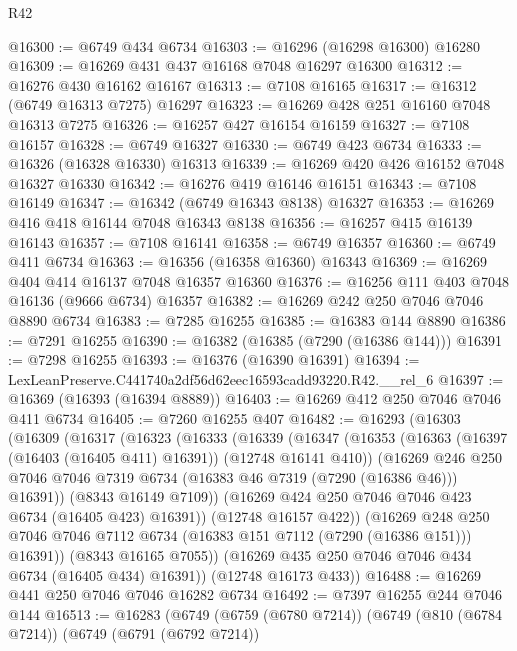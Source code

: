 \begin{lexlean}{R42}
\begin{coremodule}
{@16300 := @6749 @434 @6734
@16303 := @16296 (@16298 @16300) @16280
@16309 := @16269 @431 @437 @16168 @7048 @16297 @16300
@16312 := @16276 @430 @16162 @16167
@16313 := @7108 @16165
@16317 := @16312 (@6749 @16313 @7275) @16297
@16323 := @16269 @428 @251 @16160 @7048 @16313 @7275
@16326 := @16257 @427 @16154 @16159
@16327 := @7108 @16157
@16328 := @6749 @16327
@16330 := @6749 @423 @6734
@16333 := @16326 (@16328 @16330) @16313
@16339 := @16269 @420 @426 @16152 @7048 @16327 @16330
@16342 := @16276 @419 @16146 @16151
@16343 := @7108 @16149
@16347 := @16342 (@6749 @16343 @8138) @16327
@16353 := @16269 @416 @418 @16144 @7048 @16343 @8138
@16356 := @16257 @415 @16139 @16143
@16357 := @7108 @16141
@16358 := @6749 @16357
@16360 := @6749 @411 @6734
@16363 := @16356 (@16358 @16360) @16343
@16369 := @16269 @404 @414 @16137 @7048 @16357 @16360
@16376 := @16256 @111 @403 @7048 @16136 (@9666 @6734) @16357
@16382 := @16269 @242 @250 @7046 @7046 @8890 @6734
@16383 := @7285 @16255
@16385 := @16383 @144 @8890
@16386 := @7291 @16255
@16390 := @16382 (@16385 (@7290 (@16386 @144)))
@16391 := @7298 @16255
@16393 := @16376 (@16390 @16391)
@16394 := LexLeanPreserve.C441740a2df56d62eec16593cadd93220.R42.__rel_6
@16397 := @16369 (@16393 (@16394 @8889))
@16403 := @16269 @412 @250 @7046 @7046 @411 @6734
@16405 := @7260 @16255 @407
@16482 := @16293
    (@16303
      (@16309
        (@16317
          (@16323
            (@16333
              (@16339
                (@16347
                  (@16353
                    (@16363 (@16397 (@16403 (@16405 @411) @16391)) (@12748 @16141 @410))
                    (@16269
                      @246
                      @250
                      @7046
                      @7046
                      @7319
                      @6734
                      (@16383 @46 @7319 (@7290 (@16386 @46)))
                      @16391))
                  (@8343 @16149 @7109))
                (@16269 @424 @250 @7046 @7046 @423 @6734 (@16405 @423) @16391))
              (@12748 @16157 @422))
            (@16269
              @248
              @250
              @7046
              @7046
              @7112
              @6734
              (@16383 @151 @7112 (@7290 (@16386 @151)))
              @16391))
          (@8343 @16165 @7055))
        (@16269 @435 @250 @7046 @7046 @434 @6734 (@16405 @434) @16391))
      (@12748 @16173 @433))
@16488 := @16269 @441 @250 @7046 @7046 @16282 @6734
@16492 := @7397 @16255 @244 @7046 @144
@16513 := @16283
    (@6749
      (@6759 (@6780 @7214))
      (@6749
        (@810 (@6784 @7214))
        (@6749
          (@6791 (@6792 @7214))
}
\end{coremodule}
\end{lexlean}
